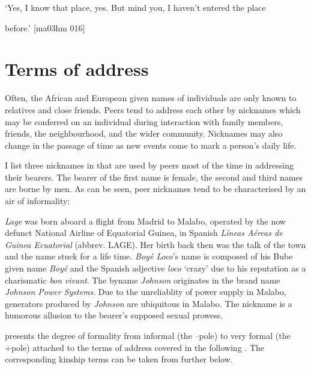 \glt ‘Yes, I know that place, yes. But mind you, I haven’t entered the place 


\glt before.’ [ma03hm 016]
\z

\section{Terms of address}\label{sec:12.3}

Often, the African and European given names of individuals are only known to relatives and close friends. Peers tend to address each other by nicknames which may be conferred on an individual during interaction with family members, friends, the neighbourhood, and the wider community. Nicknames may also change in the passage of time as new events come to mark a person’s daily life. 


I list three nicknames in  that are used by peers most of the time in addressing their bearers. The bearer of the first name is female, the second and third names are borne by men. As can be seen, peer nicknames tend to be characterised by an air of informality:


\textit{Lage} was born aboard a flight from Madrid to Malabo, operated by the now defunct National Airline of Equatorial Guinea, in Spanish \textit{Líneas Aéreas de Guinea Ecuatorial} (abbrev. LAGE). Her birth back then was the talk of the town and the name stuck for a life time. \textit{Boyé Loco}’s name is composed of his Bube given name \textit{Boyé} and the Spanish adjective \textit{loco} ‘crazy’ due to his reputation as a charismatic \textit{bon} \textit{vivant}. The byname \textit{Johnson} originates in the brand name \textit{Johnson Power Systems}. Due to the unreliablity of power supply in Malabo, generators produced by \textit{Johnson} are ubiquitous in Malabo. The nickname is a humorous allusion to the bearer’s supposed sexual prowess. 

 presents the degree of formality from informal (the –pole) to very formal (the +pole) attached to the terms of address covered in the following \citep[209]{Mühleisen2005}. The corresponding kinship terms can be taken from  further below.

